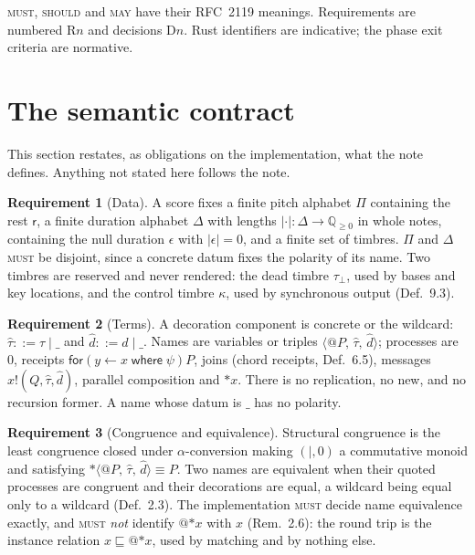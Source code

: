 \documentclass[11pt,a4paper]{article}
\makeatletter
\theoremstyle{definition}
\newtheorem{requirement}{Requirement}[section]
\theoremstyle{remark}
\newcommand{\Qnn}{\mathbb{Q}_{\geq 0}}
\newcommand{\Pit}{\Pi}
\newcommand{\Dur}{\Delta}
\newcommand{\nm}[3]{\langle @#1,\,#2,\,#3\rangle}
\newcommand{\len}[1]{|#1|}
\newcommand{\nulld}{\epsilon}
\newcommand{\rest}{\mathsf{r}}
\newcommand{\MUST}{\textsc{must}}
\newcommand{\SHOULD}{\textsc{should}}
\newcommand{\MAY}{\textsc{may}}
\newcommand{\wild}{\_}
\newcommand{\gen}{\sqsubseteq}
\makeatother
\begin{document}
\MUST, \SHOULD{} and \MAY{} have their RFC~2119 meanings. Requirements are
numbered R$n$ and decisions D$n$. Rust identifiers are indicative; the phase
exit criteria are normative.

\section{The semantic contract}\label{sec:contract}

This section restates, as obligations on the implementation, what the note
defines. Anything not stated here follows the note.

\begin{requirement}[Data]\label{req:data}
A score fixes a finite pitch alphabet $\Pit$ containing the rest $\rest$, a
finite duration alphabet $\Dur$ with lengths $\len{\cdot}:\Dur\to\Qnn$ in whole
notes, containing the null duration $\nulld$ with $\len{\nulld}=0$, and a finite
set of timbres. $\Pit$ and $\Dur$ \MUST{} be disjoint, since a concrete datum
fixes the polarity of its name. Two timbres are reserved and never rendered:
the dead timbre $\tau_\bot$, used by bases and key locations, and the control
timbre $\kappa$, used by synchronous output (Def.~9.3).
\end{requirement}

\begin{requirement}[Terms]\label{req:terms}
A decoration component is concrete or the wildcard: $\hat\tau ::= \tau \mid
\wild$ and $\hat d ::= d \mid \wild$. Names are variables or triples
$\nm{P}{\hat\tau}{\hat d}$; processes are $0$, receipts
$\mathsf{for}(y\leftarrow x\;\mathsf{where}\;\psi)P$, joins (chord receipts,
Def.~6.5), messages $x!(Q,\hat\tau,\hat d)$, parallel composition and $\ast x$.
There is no replication, no \textsf{new}, and no recursion former. A name whose
datum is $\wild$ has no polarity.
\end{requirement}

\begin{requirement}[Congruence and equivalence]\label{req:cong}
Structural congruence is the least congruence closed under $\alpha$-conversion
making $(\mid,0)$ a commutative monoid and satisfying
$\ast\nm{P}{\hat\tau}{\hat d}\equiv P$. Two names are equivalent when their
quoted processes are congruent and their decorations are equal, a wildcard being
equal only to a wildcard (Def.~2.3). The implementation \MUST{} decide name
equivalence exactly, and \MUST{} \emph{not} identify $@{\ast x}$ with $x$
(Rem.~2.6): the round trip is the instance relation $x \gen @{\ast x}$, used by
matching and by nothing else.
\end{requirement}
\end{document}
